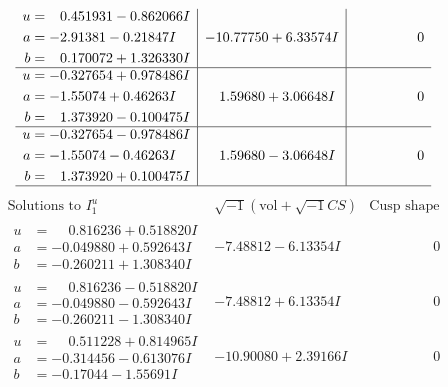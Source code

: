 \documentclass[1p]{elsarticle_modified}
\theoremstyle{definition}
\newcommand{\I}{\sqrt{-1}}
\begin{document}
$$\begin{array}{c|c|c}
\begin{aligned}
u &= \phantom{-}0.451931 - 0.862066 I \\
a &= -2.91381 - 0.21847 I \\
b &= \phantom{-}0.170072 + 1.326330 I\end{aligned}
 & -10.77750 + 6.33574 I & \phantom{-0.000000 } 0 \\ \hline\begin{aligned}
u &= -0.327654 + 0.978486 I \\
a &= -1.55074 + 0.46263 I \\
b &= \phantom{-}1.373920 - 0.100475 I\end{aligned}
 & \phantom{-}1.59680 + 3.06648 I & \phantom{-0.000000 } 0 \\ \hline\begin{aligned}
u &= -0.327654 - 0.978486 I \\
a &= -1.55074 - 0.46263 I \\
b &= \phantom{-}1.373920 + 0.100475 I\end{aligned}
 & \phantom{-}1.59680 - 3.06648 I & \phantom{-0.000000 } 0\\
 \hline 
 \end{array}$$\newpage$$\begin{array}{c|c|c}  
\text{Solutions to }I^u_{1}& \I (\text{vol} + \sqrt{-1}CS) & \text{Cusp shape}\\
 \hline 
\begin{aligned}
u &= \phantom{-}0.816236 + 0.518820 I \\
a &= -0.049880 + 0.592643 I \\
b &= -0.260211 + 1.308340 I\end{aligned}
 & -7.48812 - 6.13354 I & \phantom{-0.000000 } 0 \\ \hline\begin{aligned}
u &= \phantom{-}0.816236 - 0.518820 I \\
a &= -0.049880 - 0.592643 I \\
b &= -0.260211 - 1.308340 I\end{aligned}
 & -7.48812 + 6.13354 I & \phantom{-0.000000 } 0 \\ \hline\begin{aligned}
u &= \phantom{-}0.511228 + 0.814965 I \\
a &= -0.314456 - 0.613076 I \\
b &= -0.17044 - 1.55691 I\end{aligned}
 & -10.90080 + 2.39166 I & \phantom{-0.000000 } 0 \\ \hline\begin{aligned}

\end{aligned}
\end{array}$$
\end{document}
